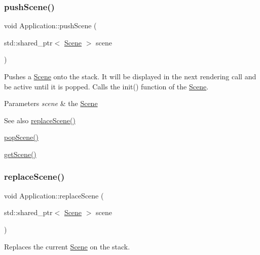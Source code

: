 \subsubsection{\texorpdfstring{pushScene()}{pushScene()}}
{\footnotesize\ttfamily void Application\+::push\+Scene (\begin{DoxyParamCaption}\item[{std\+::shared\+\_\+ptr$<$ \mbox{\hyperlink{classsage_1_1Scene}{Scene}} $>$}]{scene }\end{DoxyParamCaption})}



Pushes a \mbox{\hyperlink{classsage_1_1Scene}{Scene}} onto the stack. It will be displayed in the next rendering call and be active until it is popped. Calls the init() function of the \mbox{\hyperlink{classsage_1_1Scene}{Scene}}. 


\begin{DoxyParams}{Parameters}
{\em scene} & the \mbox{\hyperlink{classsage_1_1Scene}{Scene}} \\
\hline
\end{DoxyParams}
\begin{DoxySeeAlso}{See also}
\mbox{\hyperlink{classsage_1_1Application_ac0458ccb5b0a4aae4bcb1fc958f369f4}{replace\+Scene()}} 

\mbox{\hyperlink{classsage_1_1Application_a47b5bec61b3d93cbb4998b42d0d2ea47}{pop\+Scene()}} 

\mbox{\hyperlink{classsage_1_1Application_a4d40d8fae7f9f26cf45d8fca6e811c3f}{get\+Scene()}} 
\end{DoxySeeAlso}
\mbox{\label{classsage_1_1Application_ac0458ccb5b0a4aae4bcb1fc958f369f4}} 
\subsubsection{\texorpdfstring{replaceScene()}{replaceScene()}}
{\footnotesize\ttfamily void Application\+::replace\+Scene (\begin{DoxyParamCaption}\item[{std\+::shared\+\_\+ptr$<$ \mbox{\hyperlink{classsage_1_1Scene}{Scene}} $>$}]{scene }\end{DoxyParamCaption})}



Replaces the current \mbox{\hyperlink{classsage_1_1Scene}{Scene}} on the stack. 


